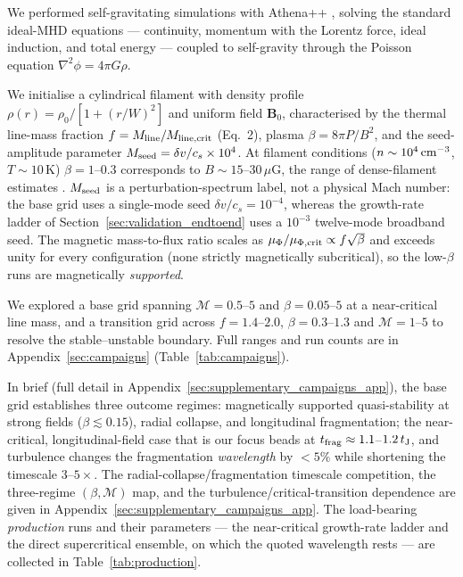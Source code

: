 \documentclass[usenatbib,twoside,twocolumn]{mnras}
\begin{document}
We performed self-gravitating simulations with Athena++ \citep{Stone2020}, solving the standard ideal-MHD equations --- continuity, momentum with the Lorentz force, ideal induction, and total energy --- coupled to self-gravity through the Poisson equation $\nabla^2\phi=4\pi G\rho$.

We initialise a cylindrical filament with density profile $\rho(r)=\rho_0/[1+(r/W)^2]$ and uniform field $\mathbf{B}_0$, characterised by the thermal line-mass fraction $f=M_{\rm line}/M_{\rm line,crit}$ (Eq.~2), plasma $\beta=8\pi P/B^2$, and the seed-amplitude parameter $M_{\rm seed}=\delta v/c_s\times10^{4}$. At filament conditions ($n\sim10^4\,{\rm cm^{-3}}$, $T\sim10$\,K) $\beta=1$--$0.3$ corresponds to $B\sim15$--$30\,\mu$G, the range of dense-filament estimates \citep{Crutcher2012}. $M_{\rm seed}$ is a perturbation-spectrum label, not a physical Mach number: the base grid uses a single-mode seed $\delta v/c_s=10^{-4}$, whereas the growth-rate ladder of Section~\ref{sec:validation_endtoend} uses a $10^{-3}$ twelve-mode broadband seed. The magnetic mass-to-flux ratio scales as $\mu_\Phi/\mu_{\Phi,\rm crit}\propto f\sqrt{\beta}$ and exceeds unity for every configuration (none strictly magnetically subcritical), so the low-$\beta$ runs are magnetically \emph{supported}.

We explored a base grid spanning $\mathcal{M}=0.5$--$5$ and $\beta=0.05$--$5$ at a near-critical line mass, and a transition grid across $f=1.4$--$2.0$, $\beta=0.3$--$1.3$ and $\mathcal{M}=1$--$5$ to resolve the stable--unstable boundary. Full ranges and run counts are in Appendix~\ref{sec:campaigns} (Table~\ref{tab:campaigns}).

In brief (full detail in Appendix~\ref{sec:supplementary_campaigns_app}), the base grid establishes three outcome regimes: magnetically supported quasi-stability at strong fields ($\beta\lesssim0.15$), radial collapse, and longitudinal fragmentation; the near-critical, longitudinal-field case that is our focus beads at $t_{\rm frag}\approx1.1$--$1.2\,t_{\rm J}$, and turbulence changes the fragmentation \emph{wavelength} by $<5\%$ while shortening the timescale $3$--$5\times$. The radial-collapse/fragmentation timescale competition, the three-regime $(\beta,\mathcal{M})$ map, and the turbulence/critical-transition dependence are given in Appendix~\ref{sec:supplementary_campaigns_app}. The load-bearing \emph{production} runs and their parameters --- the near-critical growth-rate ladder and the direct supercritical ensemble, on which the quoted wavelength rests --- are collected in Table~\ref{tab:production}.
\end{document}

